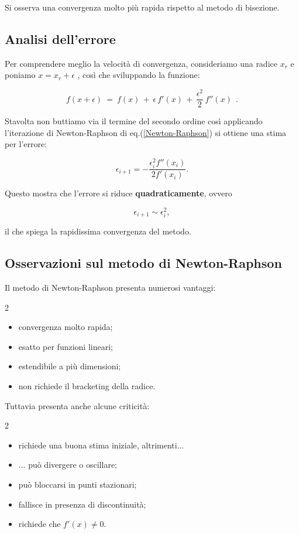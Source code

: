 Si osserva una convergenza molto più rapida rispetto al metodo di bisezione.

\subsection{Analisi dell'errore}

Per comprendere meglio la velocità di convergenza, consideriamo una radice \( x_r \) e poniamo $x = x_r + \epsilon$ , così che sviluppando la funzione:

\[
f(x + \epsilon)\ =\ f(x)\, +\, \epsilon\, f'(x)\, +\, \frac{\epsilon^2}{2}\, f''(x)\ \ .
\]

Stavolta non buttiamo via il termine del secondo ordine così applicando l'iterazione di Newton-Raphson di eq.(\ref{Newton-Raphson}) si ottiene una stima per l'errore:

\[
\epsilon_{i+1} = - \frac{\epsilon_i^2 f''(x_i)}{2 f'(x_i)}.
\]

Questo mostra che l'errore si riduce \textbf{quadraticamente}, ovvero

\[
\epsilon_{i+1} \sim \epsilon_i^2,
\]

il che spiega la rapidissima convergenza del metodo.

\subsection{Osservazioni sul metodo di Newton-Raphson}

Il metodo di Newton-Raphson presenta numerosi vantaggi:

\begin{multicols}{2}
\begin{itemize}
	\item convergenza molto rapida;
	\item esatto per funzioni lineari;
	\item estendibile a più dimensioni;
	\item non richiede il bracketing della radice.
\end{itemize}
\end{multicols}

Tuttavia presenta anche alcune criticità:

\begin{multicols}{2}
\begin{itemize}
	\item richiede una buona stima iniziale, altrimenti...
	\item ... può divergere o oscillare;
	\item può bloccarsi in punti stazionari;
	\item fallisce in presenza di discontinuità;
	\item richiede che \( f'(x) \neq 0 \).
\end{itemize}
\end{multicols}
	
